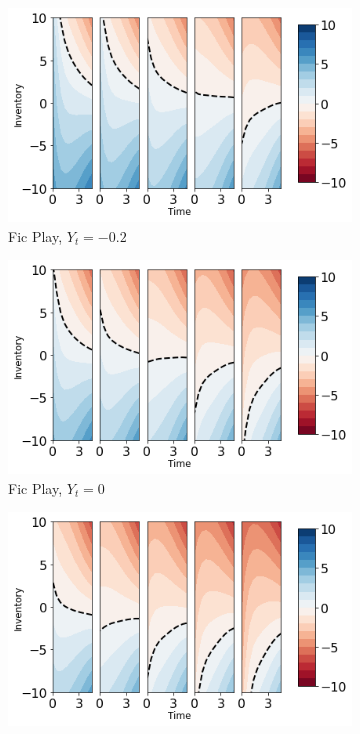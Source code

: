 \documentclass[onefignum,onetabnum]{siamonline171218}
\begin{document}
\begin{figure}[t!]
\begin{subfigure}{.32\textwidth}
  \centering
  \includegraphics[width=1\linewidth]{Figures/Fic_play_hm_-0.2.jpg}
  \caption{Fic Play, $Y_{t}=-0.2$}
\end{subfigure}
\begin{subfigure}{.32\textwidth}
  \centering
  \includegraphics[width=1\linewidth]{Figures/Fic_play_hm_0.jpg}
  \caption{Fic Play, $Y_{t}=0$}
\end{subfigure}
\begin{subfigure}{.32\textwidth}
  \centering
  \includegraphics[width=1\linewidth]{Figures/Fic_play_hm_0.2.jpg}

\end{subfigure}
\end{figure}
\end{document}

